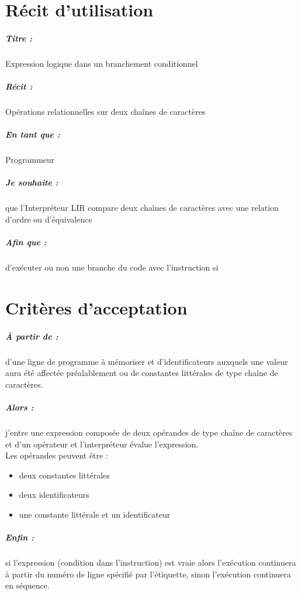 \documentclass[12pt,a5paper, notitle, oneside]{report}
\begin{document}
    \chapter*{Récit d'utilisation}

    \paragraph{Titre : } Expression logique dans un branchement
    conditionnel
    \paragraph{Récit : } Opérations relationnelles sur deux chaînes de
    caractères
    \paragraph{En tant que : } Programmeur
    \paragraph{Je souhaite : } que l'Interpréteur LIR compare deux
    chaînes de caractères avec une relation d'ordre ou d'équivalence
    \paragraph{Afin que : } d'exécuter ou non une branche du code avec
    l'instruction si
    \newpage

    \chapter*{Critères d'acceptation}

    \paragraph{À partir de : } d'une ligne de programme à mémoriser et d'identificateurs auxquels une valeur aura été affectée préalablement
    ou de constantes littérales de type chaîne de caractères.

    \paragraph{Alors : } j'entre une expression composée de deux
    opérandes de type chaîne de caractères et d'un opérateur et l'interpréteur
    évalue l'expression.
    \\ Les opérandes peuvent être :
    \begin{itemize}
        \item deux constantes littérales
        \item deux identificateurs
        \item une constante littérale et un identificateur
    \end{itemize}

    \paragraph{Enfin : } si l'expression (condition dans l'instruction)
    est vraie alors l'exécution continuera à partir du numéro de ligne
    spécifié par l’étiquette, sinon l'exécution continuera en séquence.
\end{document}
